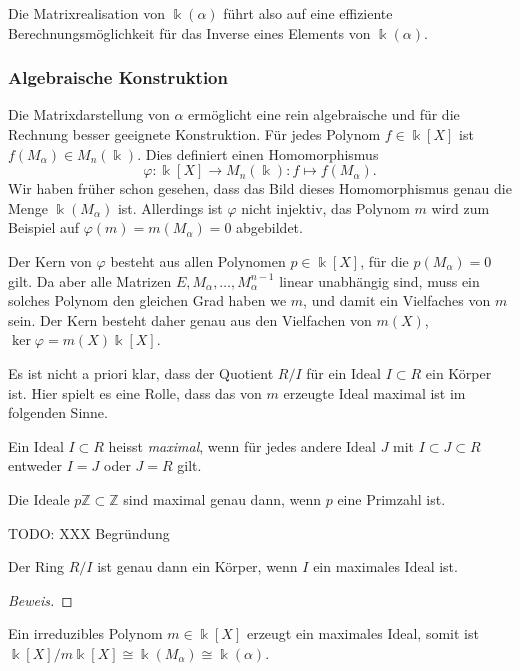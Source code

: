 Die Matrixrealisation von $\Bbbk(\alpha)$ führt also auf eine effiziente
Berechnungsmöglichkeit für das Inverse eines Elements von $\Bbbk(\alpha)$.

\subsubsection{Algebraische Konstruktion}
Die Matrixdarstellung von $\alpha$ ermöglicht eine rein algebraische
und für die Rechnung besser geeignete Konstruktion.
Für jedes Polynom $f\in\Bbbk[X]$ ist $f(M_\alpha)\in M_n(\Bbbk)$.
Dies definiert einen Homomorphismus
\[
\varphi\colon \Bbbk[X] \to M_n(\Bbbk) : f \mapsto f(M_\alpha).
\]
Wir haben früher schon gesehen, dass das Bild dieses Homomorphismus
genau die Menge $\Bbbk(M_\alpha)$ ist.
Allerdings ist $\varphi$ nicht injektiv, das Polynom $m$ wird zum
Beispiel auf $\varphi(m) = m(M_\alpha) = 0$ abgebildet.

Der Kern von $\varphi$ besteht aus allen Polynomen $p\in\Bbbk[X]$,
für die $p(M_\alpha)=0$ gilt.
Da aber alle Matrizen $E,M_\alpha,\dots,M_\alpha^{n-1}$ linear
unabhängig sind, muss ein solches Polynom den gleichen Grad haben
we $m$, und damit ein Vielfaches von $m$ sein.
Der Kern besteht daher genau aus den Vielfachen von $m(X)$,
$\ker\varphi = m(X)\Bbbk[X]$.

Es ist nicht a priori klar, dass der Quotient $R/I$ für ein
Ideal $I\subset R$ ein Körper ist.
Hier spielt es eine Rolle, dass das von $m$ erzeugte Ideal
maximal ist im folgenden Sinne.

\begin{definition}
Ein Ideal $I\subset R$ heisst {\em maximal}, wenn für jedes andere Ideal
$J$ mit $I\subset J\subset R$ entweder $I=J$ oder $J=R$ gilt.
\end{definition}

\begin{beispiel}
Die Ideale $p\mathbb{Z}\subset \mathbb{Z}$ sind maximal genau dann, wenn
$p$ eine Primzahl ist.

TODO: XXX Begründung
\end{beispiel}

\begin{satz}
Der Ring $R/I$ ist genau dann ein Körper, wenn $I$ ein maximales Ideal ist.
\end{satz}

\begin{proof}[Beweis]
\end{proof}

Ein irreduzibles Polynom $m\in\Bbbk[X]$ erzeugt ein maximales Ideal,
somit ist $\Bbbk[X]/m\Bbbk[X]\cong \Bbbk(M_\alpha) \cong \Bbbk(\alpha)$.

